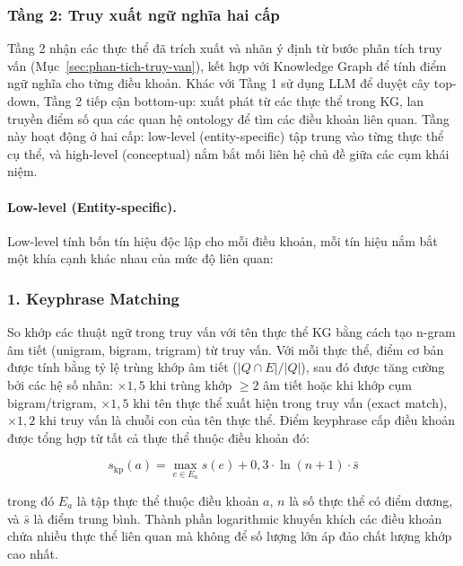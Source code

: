 \subsubsection{Tầng 2: Truy xuất ngữ nghĩa hai cấp}
\label{subsec:tang2-semantic}

Tầng 2 nhận các thực thể đã trích xuất và nhãn ý định từ bước phân tích truy vấn
(Mục~\ref{sec:phan-tich-truy-van}), kết hợp với Knowledge Graph để tính điểm ngữ
nghĩa cho từng điều khoản. Khác với Tầng 1 sử dụng LLM để duyệt cây top-down,
Tầng 2 tiếp cận bottom-up: xuất phát từ các thực thể trong KG, lan truyền điểm số
qua các quan hệ ontology để tìm các điều khoản liên quan. Tầng này hoạt động ở hai
cấp: low-level (entity-specific) tập trung vào từng thực thể cụ thể, và high-level
(conceptual) nắm bắt mối liên hệ chủ đề giữa các cụm khái niệm.

\paragraph{Low-level (Entity-specific).}
\label{subsubsec:low-level}

Low-level tính bốn tín hiệu độc lập cho mỗi điều khoản, mỗi tín hiệu nắm bắt một
khía cạnh khác nhau của mức độ liên quan:

\subsubsection*{1. Keyphrase Matching}

So khớp các thuật ngữ trong truy vấn với tên thực thể KG bằng cách tạo n-gram âm
tiết (unigram, bigram, trigram) từ truy vấn. Với mỗi thực thể, điểm cơ bản được
tính bằng tỷ lệ trùng khớp âm tiết ($|Q \cap E| / |Q|$), sau đó được tăng cường
bởi các hệ số nhân: $\times 1{,}5$ khi trùng khớp $\geq 2$ âm tiết hoặc khi khớp
cụm bigram/trigram, $\times 1{,}5$ khi tên thực thể xuất hiện trong truy vấn
(exact match), $\times 1{,}2$ khi truy vấn là chuỗi con của tên thực thể. Điểm
keyphrase cấp điều khoản được tổng hợp từ tất cả thực thể thuộc điều khoản đó:

\begin{equation}
  s_\text{kp}(a) = \max_{e \in E_a} s(e) + 0{,}3 \cdot \ln(n+1) \cdot \bar{s}
  \label{eq:keyphrase-score}
\end{equation}

\noindent trong đó $E_a$ là tập thực thể thuộc điều khoản $a$, $n$ là số thực thể
có điểm dương, và $\bar{s}$ là điểm trung bình. Thành phần logarithmic khuyến
khích các điều khoản chứa nhiều thực thể liên quan mà không để số lượng lớn áp
đảo chất lượng khớp cao nhất.

